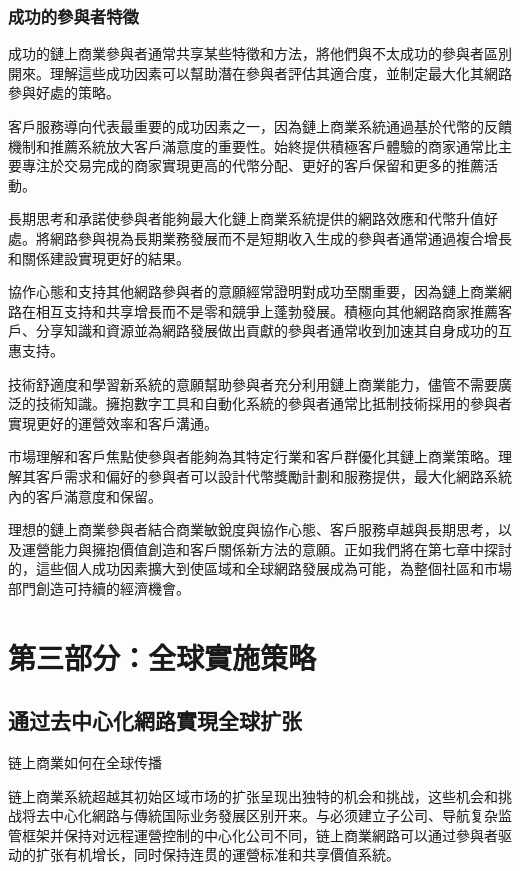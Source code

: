\documentclass[
  Letterpaper,
]{scrbook}
\begin{document}
\section{成功的參與者特徵}\label{ux6210ux529fux7684ux53c3ux8207ux8005ux7279ux5fb5}

成功的鏈上商業參與者通常共享某些特徵和方法，將他們與不太成功的參與者區別開來。理解這些成功因素可以幫助潛在參與者評估其適合度，並制定最大化其網路參與好處的策略。

客戶服務導向代表最重要的成功因素之一，因為鏈上商業系統通過基於代幣的反饋機制和推薦系統放大客戶滿意度的重要性。始終提供積極客戶體驗的商家通常比主要專注於交易完成的商家實現更高的代幣分配、更好的客戶保留和更多的推薦活動。

長期思考和承諾使參與者能夠最大化鏈上商業系統提供的網路效應和代幣升值好處。將網路參與視為長期業務發展而不是短期收入生成的參與者通常通過複合增長和關係建設實現更好的結果。

協作心態和支持其他網路參與者的意願經常證明對成功至關重要，因為鏈上商業網路在相互支持和共享增長而不是零和競爭上蓬勃發展。積極向其他網路商家推薦客戶、分享知識和資源並為網路發展做出貢獻的參與者通常收到加速其自身成功的互惠支持。

技術舒適度和學習新系統的意願幫助參與者充分利用鏈上商業能力，儘管不需要廣泛的技術知識。擁抱數字工具和自動化系統的參與者通常比抵制技術採用的參與者實現更好的運營效率和客戶溝通。

市場理解和客戶焦點使參與者能夠為其特定行業和客戶群優化其鏈上商業策略。理解其客戶需求和偏好的參與者可以設計代幣獎勵計劃和服務提供，最大化網路系統內的客戶滿意度和保留。

理想的鏈上商業參與者結合商業敏銳度與協作心態、客戶服務卓越與長期思考，以及運營能力與擁抱價值創造和客戶關係新方法的意願。正如我們將在第七章中探討的，這些個人成功因素擴大到使區域和全球網路發展成為可能，為整個社區和市場部門創造可持續的經濟機會。

\part{第三部分：全球實施策略}

\chapter{通过去中心化網路實現全球扩张}\label{sec-global-expansion}

链上商業如何在全球传播

链上商業系統超越其初始区域市场的扩张呈现出独特的机会和挑战，这些机会和挑战将去中心化網路与傳統国际业务發展区别开来。与必须建立子公司、导航复杂监管框架并保持对远程運營控制的中心化公司不同，链上商業網路可以通过參與者驱动的扩张有机增长，同时保持连贯的運營标准和共享價值系統。
\end{document}
